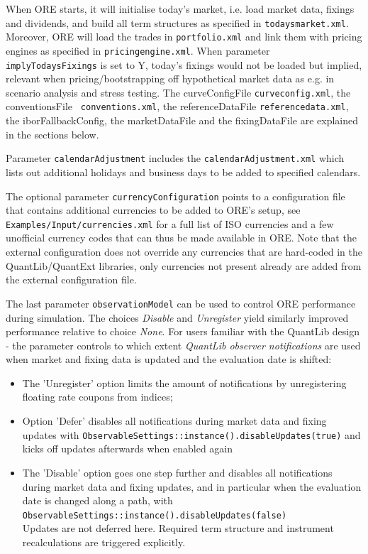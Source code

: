 \documentclass[12pt, a4paper]{article}
\begin{document}
When ORE starts, it will initialise today's market, i.e. load market data, fixings and dividends, and build all term
structures as specified in {\tt todaysmarket.xml}.  Moreover, ORE will load the trades in {\tt portfolio.xml} and link
them with pricing engines as specified in {\tt pricingengine.xml}. When parameter {\tt implyTodaysFixings} is set to Y,
today's fixings would not be loaded but implied, relevant when pricing/bootstrapping off hypothetical market data as
e.g. in scenario analysis and stress testing. The curveConfigFile {\tt curveconfig.xml}, the conventionsFile {\tt
  conventions.xml}, the referenceDataFile {\tt referencedata.xml}, the iborFallbackConfig, the marketDataFile and the
fixingDataFile are explained in the sections below.

\medskip Parameter {\tt calendarAdjustment} includes the {\tt calendarAdjustment.xml} which lists out additional holidays and
business days to be added to specified calendars.

\medskip The optional parameter {\tt currencyConfiguration} points to a configuration file that contains additional currencies
to be added to ORE's setup, see {\tt Examples/Input/currencies.xml} for a full list of ISO currencies and a few unofficial currency
codes that can thus be made available in ORE. Note that the external configuration does not override any currencies that are
hard-coded in the QuantLib/QuantExt libraries, only currencies not present already are added from the external configuration file.

\medskip The last parameter {\tt observationModel} can be used to control ORE performance during simulation. The choices
{\em Disable } and {\em Unregister } yield similarly improved performance relative to choice {\em None}. For users
familiar with the QuantLib design - the parameter controls to which extent {\em QuantLib observer notifications} are
used when market and fixing data is updated and the evaluation date is shifted:
\begin{itemize}
\item The 'Unregister' option limits the amount of notifications by unregistering floating rate coupons from indices;
\item Option 'Defer' disables all notifications during market data and fixing updates with
{\tt ObservableSettings::instance().disableUpdates(true)}
and kicks off updates afterwards when enabled again
\item The 'Disable' option goes one step further and disables all notifications during market data and fixing updates,
  and in particular when the evaluation date is changed along a path, with \\
  {\tt ObservableSettings::instance().disableUpdates(false)} \\
  Updates are not deferred here. Required term structure and instrument recalculations are triggered explicitly.
\end{itemize}
\end{document}
